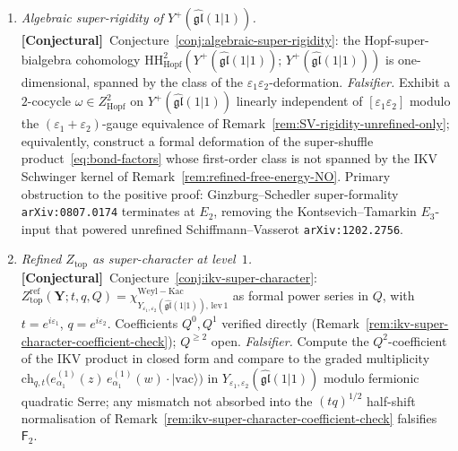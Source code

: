 \documentclass[11pt]{amsart}
\theoremstyle{definition}
\providecommand{\bY}{\mathbf{Y}}
\providecommand{\fgl}{\mathfrak{gl}}
\providecommand{\HH}{\mathrm{HH}}
\providecommand{\ClaimStatusConjectured}{\textbf{\textsf{[Conjectural]}}}
\begin{document}
\begin{enumerate}[label=\emph{$\mathsf F_{\arabic*}$.}, leftmargin=2.4em]
\item \emph{Algebraic super-rigidity of $Y^{+}(\widehat{\fgl}(1|1))$.}
  \ClaimStatusConjectured\
  Conjecture~\ref{conj:algebraic-super-rigidity}: the
  Hopf-super-bialgebra cohomology
  $\HH^{2}_{\mathrm{Hopf}}(Y^{+}(\widehat{\fgl}(1|1));\,
  Y^{+}(\widehat{\fgl}(1|1)))$ is one-dimensional, spanned by the
  class of the $\varepsilon_{1}\varepsilon_{2}$-deformation.
  \emph{Falsifier.} Exhibit a $2$-cocycle
  $\omega\in Z^{2}_{\mathrm{Hopf}}$ on $Y^{+}(\widehat{\fgl}(1|1))$
  linearly independent of $[\varepsilon_{1}\varepsilon_{2}]$ modulo
  the $(\varepsilon_{1}+\varepsilon_{2})$-gauge equivalence of
  Remark~\ref{rem:SV-rigidity-unrefined-only}; equivalently, construct
  a formal deformation of the super-shuffle
  product~\eqref{eq:bond-factors} whose first-order class is not
  spanned by the IKV Schwinger kernel of
  Remark~\ref{rem:refined-free-energy-NO}. Primary obstruction to the
  positive proof: Ginzburg--Schedler super-formality
  \texttt{arXiv:0807.0174} terminates at $E_{2}$, removing the
  Kontsevich--Tamarkin $E_{3}$-input that powered unrefined
  Schiffmann--Vasserot \texttt{arXiv:1202.2756}.

\item \emph{Refined $Z_{\mathrm{top}}$ as super-character at level~$1$.}
  \ClaimStatusConjectured\
  Conjecture~\ref{conj:ikv-super-character}:
  $Z^{\mathrm{ref}}_{\mathrm{top}}(\bY;t,q,Q)
   = \chi^{\mathrm{Weyl{-}Kac}}_{
     Y_{\varepsilon_{1},\varepsilon_{2}}(\widehat{\fgl}(1|1)),\,\mathrm{lev}\,1}$
  as formal power series in $Q$, with $t = e^{i\varepsilon_{1}}$,
  $q = e^{i\varepsilon_{2}}$. Coefficients $Q^{0}, Q^{1}$ verified
  directly (Remark~\ref{rem:ikv-super-character-coefficient-check});
  $Q^{\geq 2}$ open. \emph{Falsifier.} Compute the $Q^{2}$-coefficient
  of the IKV product in closed form and compare to the graded
  multiplicity
  $\mathrm{ch}_{q,t}\bigl(e^{(1)}_{\alpha_{1}}(z)\,
   e^{(1)}_{\alpha_{1}}(w)\cdot|\mathrm{vac}\rangle\bigr)$
  in $Y_{\varepsilon_{1},\varepsilon_{2}}(\widehat{\fgl}(1|1))$ modulo
  fermionic quadratic Serre; any mismatch not absorbed into the
  $(tq)^{1/2}$ half-shift normalisation of
  Remark~\ref{rem:ikv-super-character-coefficient-check} falsifies
  $\mathsf F_{2}$.


\end{enumerate}
\end{document}
